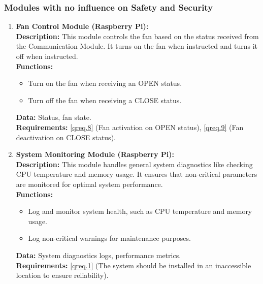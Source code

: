 \subsubsection{Modules with no influence on Safety and Security}
\begin{enumerate}
    \item \textbf{Fan Control Module (Raspberry Pi):} \\ 
        \textbf{Description:} This module controls the fan based on the status received from the Communication Module. It turns on the fan when instructed and turns it off when instructed. \\ 
        \textbf{Functions:}
        \begin{itemize}
            \item Turn on the fan when receiving an OPEN status.
            \item Turn off the fan when receiving a CLOSE status.
        \end{itemize}
        \textbf{Data:} Status, fan state. \\ 
        \textbf{Requirements:} \ref{qreq.8} (Fan activation on OPEN status), \ref{qreq.9} (Fan deactivation on CLOSE status).

    \item \textbf{System Monitoring Module (Raspberry Pi):} \\ 
        \textbf{Description:} This module handles general system diagnostics like checking CPU temperature and memory usage. It ensures that non-critical parameters are monitored for optimal system performance. \\ 
        \textbf{Functions:}
        \begin{itemize}
            \item Log and monitor system health, such as CPU temperature and memory usage.
            \item Log non-critical warnings for maintenance purposes.
        \end{itemize}
        \textbf{Data:} System diagnostics logs, performance metrics. \\ 
        \textbf{Requirements:} \ref{qreq.1} (The system should be installed in an inaccessible location to ensure reliability).
\end{enumerate}

